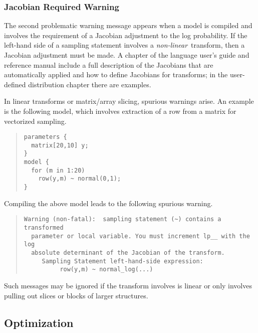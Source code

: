 \subsubsection{Jacobian Required Warning}

The second problematic warning message appears when a model is
compiled and involves the requirement of a Jacobian adjustment to the
log probability.  If the left-hand side of a sampling statement
involves a \emph{non-linear}\ transform, then a Jacobian adjustment
must be made.  A chapter of the language user's guide and reference
manual include a full description of the Jacobians that are
automatically applied and how to define Jacobians for transforms;  in
the user-defined distribution chapter there are examples.

In linear transforms or matrix/array slicing, spurious warnings
arise.  An example is the following model, which involves extraction
of a row from a matrix for vectorized sampling.
%
\begin{quote}
\begin{Verbatim}
parameters {
  matrix[20,10] y;
}
model {
  for (m in 1:20)
    row(y,m) ~ normal(0,1);
}
\end{Verbatim}
\end{quote}
%
Compiling the above model leads to the following spurious warning.
%
\begin{quote}\small
\begin{Verbatim}
Warning (non-fatal):  sampling statement (~) contains a transformed
  parameter or local variable. You must increment lp__ with the log 
  absolute determinant of the Jacobian of the transform.
     Sampling Statement left-hand-side expression:
          row(y,m) ~ normal_log(...)
\end{Verbatim}
\end{quote}
%
Such messages may be ignored if the transform involves is linear or
only involves pulling out slices or blocks of larger structures.

\subsection{Optimization}

